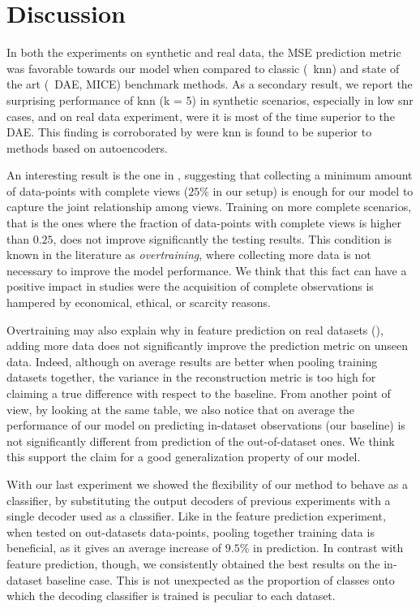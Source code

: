 \section{Discussion}

In both the experiments on synthetic and real data, the MSE prediction metric was favorable towards our model when compared to classic (\eg\ knn) and state of the art (\eg\ DAE, MICE) benchmark methods.
As a secondary result, we report the surprising performance of knn (k = 5) in synthetic scenarios, especially in low snr cases, and on real data experiment, were it is most of the time superior to the DAE.
This finding is corroborated by \cite{Platias2020} were knn is found to be superior to methods based on autoencoders.

An interesting result is the one in , suggesting that collecting a minimum amount of data-points with complete views ($25\%$ in our setup) is enough for our model to capture the joint relationship among views.
Training on more complete scenarios, that is the ones where the fraction of data-points with complete views is higher than $0.25$, does not improve significantly the testing results.
This condition is known in the literature as \textit{overtraining}, where collecting more data is not necessary to improve the model performance.
We think that this fact can have a positive impact in studies were the acquisition of complete observations is hampered by economical, ethical, or scarcity reasons.

Overtraining may also explain why in feature prediction on real datasets (), adding more data does not significantly improve the prediction metric on unseen data.
Indeed, although on average results are better when pooling training datasets together, the variance in the reconstruction metric is too high for claiming a true difference with respect to the baseline.
From another point of view, by looking at the same table, we also notice that on average the performance of our model on predicting in-dataset observations (our baseline) is not significantly different from prediction of the out-of-dataset ones.
We think this support the claim for a good generalization property of our model.

With our last experiment we showed the flexibility of our method to behave as a classifier, by substituting the output decoders of previous experiments with a single decoder used as a classifier.
Like in the feature prediction experiment, when tested on out-datasets data-points, pooling together training data is beneficial, as it gives an average increase of $9.5\%$ in  prediction.
In contrast with feature prediction, though, we consistently obtained the best results on the in-dataset baseline case.
This is not unexpected as the proportion of classes onto which the decoding classifier is trained is peculiar to each dataset.

